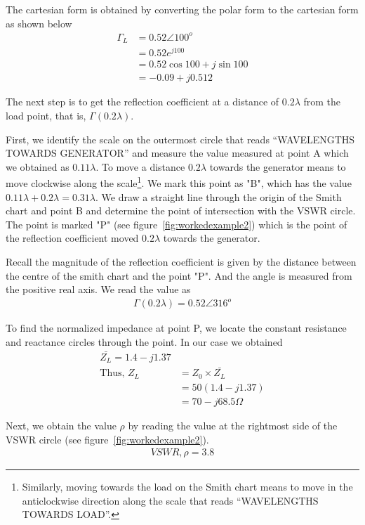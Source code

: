 \begin{exmp}
The cartesian form is obtained by converting the polar form to the cartesian form as shown below
\begin{align*}
\Gamma_{L} &= 0.52\angle100^o\\
&= 0.52e^{j100}\\
&= 0.52{\cos100 + j\sin100}\\
&= -0.09+j0.512
\end{align*}

The next step is to get the reflection coefficient at a distance of $0.2\lambda$ from the load point, that is, $\Gamma(0.2\lambda)$. 

First, we identify the scale on the outermost circle that reads \textquotedblleft WAVELENGTHS TOWARDS GENERATOR\textquotedblright\; and measure the value measured at point A which we obtained as $0.11\lambda$. To move a distance $0.2\lambda$ towards the generator means to move clockwise along the scale\footnote{
Similarly, moving towards the load on the Smith chart means to move in the anticlockwise direction along the scale that reads \textquotedblleft WAVELENGTHS TOWARDS LOAD\textquotedblright\;.
}. We mark this point as "B", which has the value $0.11\lambda + 0.2\lambda=0.31\lambda$. We draw a straight line through the origin of the Smith chart and point B and determine the point of intersection with the VSWR circle. The point is marked "P" (see figure~\ref{fig:workedexample2}) which is the point of the reflection coefficient moved $0.2\lambda$ towards the generator. 

Recall the magnitude of the reflection coefficient is given by the distance between the centre of the smith chart and the point "P". And the angle is measured from the positive real axis. We read the value as
\begin{align*}
\Gamma(0.2\lambda) = 0.52\angle316^o
\end{align*}

To find the normalized impedance at point P, we locate the constant resistance and reactance circles through the point. In our case we obtained
\begin{align*}
\bar{Z_L}=1.4-j1.37\\
\text{Thus, }Z_L &=Z_{0}\times\bar{Z_L}\\
&= 50(1.4-j1.37)\\
&= 70-j68.5\varOmega
\end{align*}

Next, we obtain the value $\rho$ by reading the value at the rightmost side of the VSWR circle (see figure~\ref{fig:workedexample2}).
\begin{align*}
VSWR, \rho = 3.8
\end{align*}
\end{exmp}

